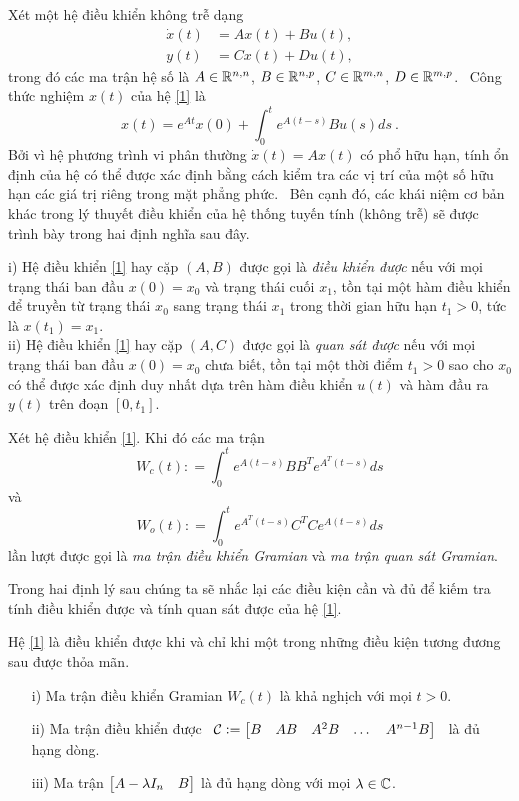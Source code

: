 Xét một hệ điều khiển không trễ dạng
%
\begin{equation}\label{1}
\begin{split}
\dot{x}(t) &= Ax(t)+Bu(t), \\
y(t) &= Cx(t) + Du(t),
\end{split}
\end{equation}
%
trong đó các ma trận hệ số là $A \in \mathbb{R}^{n,n}$, $B\in \mathbb{R}^{n,p}$, $C\in \mathbb{R}^{m,n}$, $D\in \mathbb{R}^{m,p}$. \ 
Công thức nghiệm $x(t)$ của hệ \eqref{1} là
%
\begin{equation}\label{sol}
x(t) = e^{At} x(0) + \int_{0}^{t} e^{A(t-s)} B u(s) ds \ .
\end{equation}
%
Bởi vì hệ phương trình vi phân thường $\dot{x}(t) = Ax(t)$ có phổ hữu hạn, tính ổn định của hệ có thể được xác định bằng cách kiểm tra các vị trí của một số hữu hạn các giá trị riêng trong mặt phẳng phức. \
Bên cạnh đó, các khái niệm cơ bản khác trong lý thuyết điều khiển của hệ thống tuyến tính (không trễ) sẽ được trình bày trong hai định nghĩa sau đây.
%
\begin{dng}\citep{Che98}
i) Hệ điều khiển \eqref{1} hay cặp $(A,B)$ được gọi là \emph{điều khiển được} nếu với mọi trạng thái ban đầu $x(0)=x_0$ và trạng thái cuối $x_1$, tồn tại một hàm điều khiển để truyền từ trạng thái $x_0$ sang trạng thái $x_1$ trong thời gian hữu hạn $t_1>0$, tức là $x(t_1) = x_1$. \\
ii) Hệ điều khiển \eqref{1} hay cặp $(A,C)$ được gọi là \emph{quan sát được} nếu với mọi trạng thái ban đầu $x(0)=x_0$ chưa biết, tồn tại một thời điểm $t_1 > 0$ sao cho $x_0$ có thể được xác định duy nhất dựa trên hàm điều khiển $u(t)$ và hàm đầu ra $y(t)$ trên đoạn $[0,t_1]$. 
\end{dng}
%

\begin{dng}\citep{Che98} Xét hệ điều khiển \eqref{1}. Khi đó các ma trận 
%
\[
W_c(t) : = \int_{0}^{t} e^{A(t-s)} B B^T e^{A^T (t-s)}ds
\]
%	
và 
%
\[
W_o(t) : = \int_{0}^{t} e^{A^T(t-s)} C^T C  e^{A (t-s)}ds
\]
%	
lần lượt được gọi là \emph{ma trận điều khiển Gramian} và \emph{ma trận quan sát Gramian}.
\end{dng}

Trong hai định lý sau chúng ta sẽ nhắc lại các điều kiện cần và đủ để kiếm tra 
tính điều khiển được và tính quan sát được của hệ \eqref{1}.

\begin{dly}\citep[Chương 6]{Che98}
Hệ \eqref{1} là điều khiển được khi và chỉ khi một trong những điều kiện tương đương sau được thỏa mãn.
\begin{enumerate}
\item[i)] Ma trận điều khiển Gramian $W_c(t)$ là khả nghịch với mọi $t>0$. 
\item[ii)] Ma trận điều khiển được \ $\mathcal{C} := \begin{bmatrix} B & AB & A^2B & \dots & A^{n-1} B \end{bmatrix}$ \ là đủ hạng dòng.
\item[iii)] Ma trận $\begin{bmatrix} A-\lambda I_n & B \end{bmatrix}$ là đủ hạng dòng với mọi $\lambda \in \mathbb{C}$.
\end{enumerate}
\end{dly}



